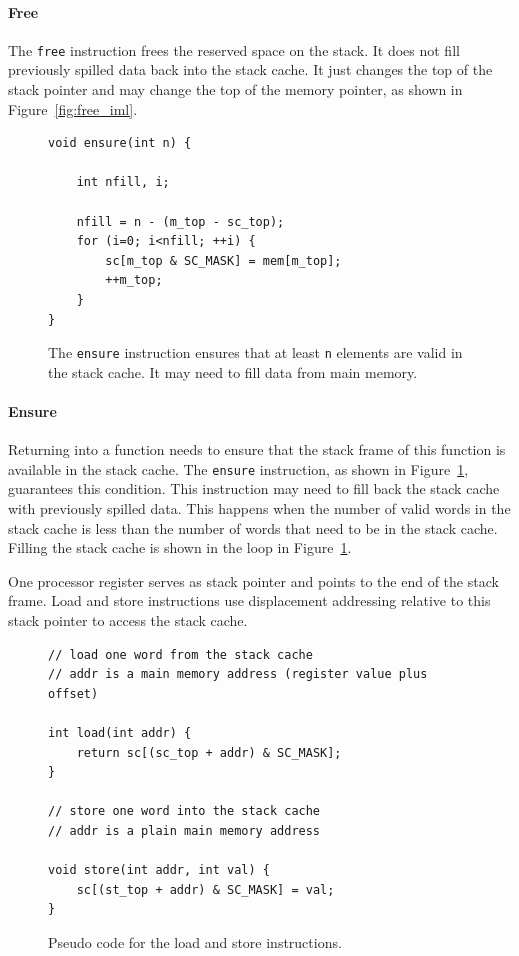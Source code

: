 \documentclass[a4paper,fontsize=10pt,twoside,DIV15,BCOR12mm,headinclude=true,footinclude=false,pagesize,bibtotoc]{scrbook}
\newcommand{\code}[1]{{\texttt{#1}}}
\begin{document}
\paragraph{Free} The \code{free} instruction frees the reserved
space on the stack. It does not fill previously spilled data back into the stack cache.
It just changes the top of the stack pointer and may change the top of the memory
pointer, as shown in Figure~\ref{fig:free_iml}.


\begin{figure}
\begin{lstlisting}
void ensure(int n) {

    int nfill, i;

    nfill = n - (m_top - sc_top);
    for (i=0; i<nfill; ++i) {
        sc[m_top & SC_MASK] = mem[m_top];
        ++m_top;
    }
}
\end{lstlisting}
	\caption{The \code{ensure} instruction ensures that
	at least \code{n} elements are valid in the stack cache.
	It may need to fill data from main memory.}
 	\label{fig:ens_iml}
\end{figure}

\paragraph{Ensure} Returning into a function needs to ensure that the stack
frame of this function is available in the stack cache. The \code{ensure} instruction,
as shown in Figure~\ref{fig:ens_iml}, guarantees this condition.
This instruction may need to fill back the stack cache with previously spilled data.
This happens when the number of valid words in the stack cache is less than the
number of words that need to be in the stack cache.
Filling the stack cache is shown in the loop in Figure~\ref{fig:ens_iml}.

One processor register serves as stack pointer and points to the end of the stack frame.
Load and store instructions use displacement addressing relative to this stack pointer
to access the stack cache.

\begin{figure}
\begin{lstlisting}
// load one word from the stack cache
// addr is a main memory address (register value plus offset)

int load(int addr) {
    return sc[(sc_top + addr) & SC_MASK];
}

// store one word into the stack cache
// addr is a plain main memory address

void store(int addr, int val) {
    sc[(st_top + addr) & SC_MASK] = val;
}
\end{lstlisting}
	\caption{Pseudo code for the load and store instructions.}
 	\label{fig:ld_st_iml}
\end{figure}
\end{document}
